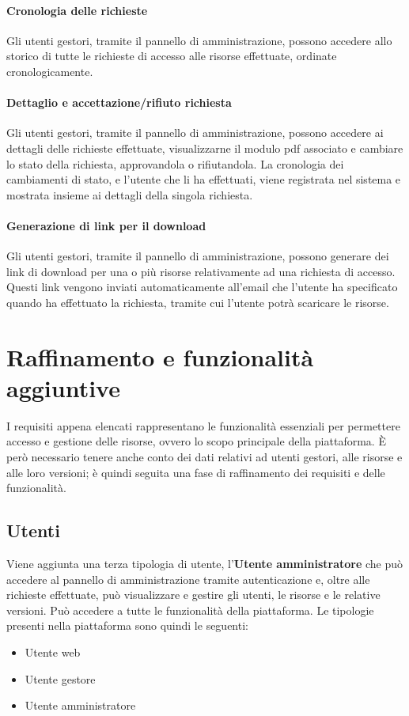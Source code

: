 \paragraph{Cronologia delle richieste}
Gli utenti gestori, tramite il pannello di amministrazione, possono accedere allo
storico di tutte le richieste di accesso alle risorse effettuate, ordinate
cronologicamente.

\paragraph{Dettaglio e accettazione/rifiuto richiesta}
Gli utenti gestori, tramite il pannello di amministrazione, possono accedere ai
dettagli delle richieste effettuate, visualizzarne il modulo pdf associato e
cambiare lo stato della richiesta, approvandola o rifiutandola.
La cronologia dei cambiamenti di stato, e l'utente che li ha effettuati, viene
registrata nel sistema e mostrata insieme ai dettagli della singola richiesta.

\paragraph{Generazione di link per il download}
Gli utenti gestori, tramite il pannello di amministrazione, possono generare dei
link di download per una o più risorse relativamente ad una richiesta di accesso.
Questi link vengono inviati automaticamente all'email che l'utente ha specificato
quando ha effettuato la richiesta, tramite cui l'utente potrà scaricare le risorse.



\section{Raffinamento e funzionalità aggiuntive}
I requisiti appena elencati rappresentano le funzionalità essenziali per permettere
accesso e gestione delle risorse, ovvero lo scopo principale della piattaforma.
È però necessario tenere anche conto dei dati relativi ad utenti gestori, alle
risorse e alle loro versioni; è quindi seguita una fase di raffinamento dei
requisiti e delle funzionalità.


\subsection{Utenti}
Viene aggiunta una terza tipologia di utente, l'\textbf{Utente amministratore}
che può accedere al pannello di amministrazione tramite autenticazione e, oltre
alle richieste effettuate, può visualizzare e gestire gli utenti, le risorse e
le relative versioni. Può accedere a tutte le funzionalità della piattaforma.
Le tipologie presenti nella piattaforma sono quindi le seguenti:
\begin{itemize}
	\item Utente web
	\item Utente gestore
	\item Utente amministratore
\end{itemize}


